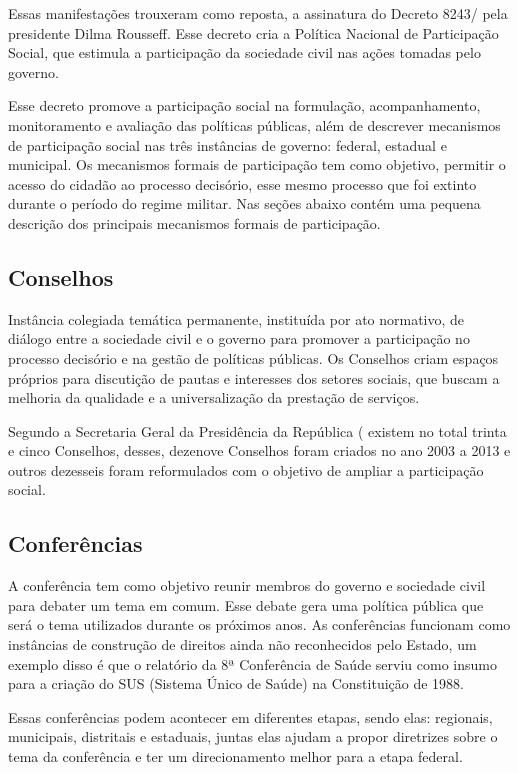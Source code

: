 Essas manifestações trouxeram como reposta, a assinatura do Decreto 8243/\citeyear{decreto8243} pela presidente Dilma Rousseff. Esse decreto cria a Política Nacional de Participação Social, que estimula a participação da sociedade civil nas ações tomadas pelo governo.

Esse decreto promove a participação social na formulação, acompanhamento, monitoramento e avaliação das políticas públicas, além de descrever mecanismos de participação social nas três instâncias de governo: federal, estadual e municipal. Os mecanismos formais de participação tem como objetivo, permitir o acesso do cidadão ao processo decisório, esse mesmo processo que foi extinto durante o período do regime militar. Nas seções abaixo contém uma pequena descrição dos principais mecanismos formais de participação.

\subsection*{Conselhos}

Instância colegiada temática permanente, instituída por ato normativo, de diálogo entre a sociedade civil e o governo para promover a participação no processo decisório e na gestão de políticas públicas. Os Conselhos criam espaços próprios para discutição de pautas e interesses dos setores sociais, que buscam a melhoria da qualidade e a universalização da prestação de serviços.

Segundo a Secretaria Geral da Presidência da República (\cite{sgpr2010conselhos} existem no total trinta e cinco Conselhos, desses, dezenove Conselhos foram criados no ano 2003 a 2013 e outros dezesseis foram reformulados com o objetivo de ampliar a participação social.


\subsection*{Conferências}

A conferência tem como objetivo reunir membros do governo e sociedade civil para debater um tema em comum. Esse debate gera uma política pública que será o tema utilizados durante os próximos anos. As conferências funcionam como instâncias de construção de direitos ainda não reconhecidos pelo Estado, um exemplo disso é que o relatório da 8ª Conferência de Saúde serviu como insumo para a criação do SUS (Sistema Único de Saúde) na Constituição de 1988.

Essas conferências podem acontecer em diferentes etapas, sendo elas: regionais, municipais, distritais e estaduais, juntas elas ajudam a propor diretrizes sobre o tema da conferência e ter um direcionamento melhor para a etapa federal.

